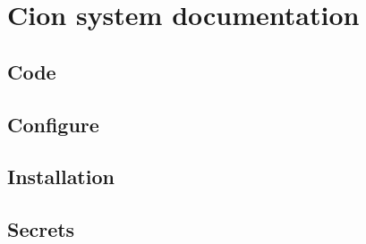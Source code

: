 \chapter{Cion system documentation}

\section{Code}


\section{Configure}


\section{Installation}


\section{Secrets}
